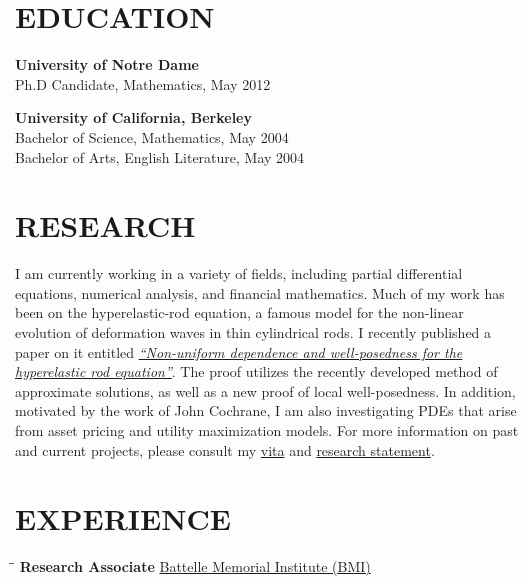 \documentclass{resume}
\begin{document}
\begin{resume}


	\section{EDUCATION}  \vspace{0.05in}
	\textbf{University of Notre Dame} \\
	Ph.D Candidate, Mathematics, May 2012 

	{\bf \vspace{-0.1in} University of California, Berkeley}\\
	Bachelor of Science, Mathematics, May 2004\\
	Bachelor of Arts, English Literature, May 2004
	
	\section{RESEARCH}
	\vspace{0.05in}
    I am currently working in a variety of fields, including partial
    differential equations, numerical analysis, and financial mathematics. Much
    of my work has been on the hyperelastic-rod equation, a famous model for the
    non-linear evolution of deformation waves in thin cylindrical rods. I
    recently published a paper on it entitled
    \href{http://davidkarapetyan.com/pdfs/hr-nud-2010.pdf}{\it ``Non-uniform
        dependence and well-posedness for the hyperelastic rod equation''}. The
        proof utilizes the recently developed method of approximate solutions,
        as well as a new proof
    of local well-posedness.
    In addition, motivated by the work of John Cochrane, I am also investigating
    PDEs that arise from asset pricing and utility maximization models.
    For more information on past and current projects, please consult my
    \href{http://davidkarapetyan.com/pdfs/cv.pdf}{vita} and
    \href{http://davidkarapetyan.com/pdfs/research-statement.pdf}{research statement}. 	 \section{EXPERIENCE}
	\vspace{-0.1in}	
	\begin{tabbing}
		\hspace{2.3in}\= \hspace{2.6in}\= \kill
        {\bf Research Associate} \>\href{http://www.battelle.org/}{Battelle
        Memorial Institute (BMI)}     

\end{tabbing}
\end{resume}
\end{document}
